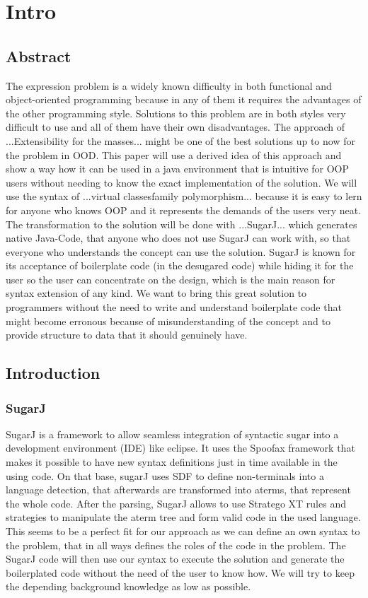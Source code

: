 \documentclass{report}
\begin{document}
\chapter{Intro}

\section{Abstract}


The expression problem is a widely known difficulty in both functional and object-oriented programming because in any of them it requires the advantages of the other programming style. Solutions to this problem are in both styles very difficult to use and all of them have their own disadvantages. The approach of ...Extensibility for the masses... might be one of the best solutions up to now for the problem in OOD. This paper will use a derived idea of this approach and show a way how it can be used in a java environment that is intuitive for OOP users without needing to know the exact implementation of the solution. We will use the syntax of 
...virtual classesfamily polymorphism... because it is easy to lern for anyone who knows OOP and it represents the demands of the users very neat. The transformation to the solution will be done with ...SugarJ... which generates native Java-Code, that anyone who does not use SugarJ can work with, so that everyone who understands the concept can use the solution. SugarJ is known for its acceptance of boilerplate code (in the desugared code) while hiding it for the user so the user can concentrate on the design, which is the main reason for syntax extension of any kind. We want to bring this great solution to programmers without the need to write and understand boilerplate code that might become erronous because of misunderstanding of the concept and to provide structure to data that it should genuinely have.


\section{Introduction}

\subsection{SugarJ}

SugarJ is a framework to allow seamless integration of syntactic sugar into a development environment (IDE) like eclipse. It uses the Spoofax framework that makes it possible to have new syntax definitions just in time available in the using code. On that base, sugarJ uses SDF to define non-terminals into a language detection, that afterwards are transformed into aterms, that represent the whole code. After the parsing, SugarJ allows to use Stratego XT rules and strategies to manipulate the aterm tree and form valid code in the used language. This seems to be a perfect fit for our approach as we can define an own syntax to the problem, that in all ways defines the roles of the code in the problem. The SugarJ code will then use our syntax to execute the solution and generate the boilerplated code without the need of the user to know how. We will try to keep the depending background knowledge as low as possible.
\end{document}
